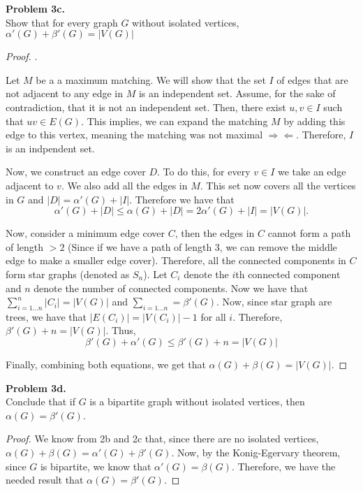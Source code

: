 \documentclass{article}
\newcommand{\size}[1]{|#1|}
\newcommand{\contradiction}{\Rightarrow\!\Leftarrow}
\newenvironment{hwproof}[2]
{
    \textbf{Problem #1.}\\
    #2
    \begin{proof}
}{
    \end{proof}
}
\begin{document}
\begin{hwproof}
    {3c}
    {Show that for every graph $G$ without isolated vertices, $\alpha'(G) + \beta'(G) = \size{V(G)}$}.

    Let $M$ be a a maximum matching. We will show that the set $I$ of edges that are not adjacent to any edge in $M$ is an independent set.
    Assume, for the sake of contradiction, that it is not an independent set.
    Then, there exist $u,v \in I$ such that $uv \in E(G)$. This implies, we can expand the matching $M$ by adding this edge to this
    vertex, meaning the matching was not maximal $\contradiction$. Therefore, $I$ is an indpendent set.

    Now, we construct an edge cover $D$. To do this, for every $v\in I$ we take an edge adjacent to $v$. We also add all the edges in $M$.
    This set now covers all the vertices in $G$ and $\size{D} = \alpha'(G) + \size{I}$. Therefore we have that
    \begin{equation*}
        \alpha'(G) + \size{D} \leq \alpha(G) + \size{D} = 2\alpha'(G) + \size{I} = \size{V(G)}.
    \end{equation*}

    Now, consider a minimum edge cover $C$, then the edges in $C$ cannot form a path of length $>2$ (Since if we have a path of length 3, we
    can remove the middle edge to make a smaller edge cover). Therefore, all the connected components in $C$ form star graphs (denoted as $S_n$).
    Let $C_i$ denote the $i$th connected component and $n$ denote the number of connected components.
    Now we have that $\sum_{i=1...n}^n \size{C_i} = \size{V(G)}$ and $\sum_{i=1...n} = \beta'(G)$. Now, since star graph are trees, we have that
    $\size{E(C_i)} = \size{V(C_i)} -1$ for all $i$. Therefore, $\beta'(G) + n = \size{V(G)}$. Thus,
    \begin{equation*}
        \beta'(G) + \alpha'(G) \leq \beta'(G) + n = \size{V(G)}
    \end{equation*}

    Finally, combining both equations, we get that $\alpha(G) + \beta(G) = \size{V(G)}$.
\end{hwproof}

\begin{hwproof}
    {3d}
    {Conclude that if $G$ is a bipartite graph without isolated vertices, then $\alpha(G) = \beta'(G)$.}

    We know from 2b and 2c that, since there are no isolated vertices, $\alpha(G) + \beta(G) = \alpha'(G) + \beta'(G)$. Now, by the Konig-Egervary
    theorem, since $G$ is bipartite, we know that $\alpha'(G) = \beta(G)$. Therefore, we have the needed result that $\alpha(G) = \beta'(G)$.
\end{hwproof}
\end{document}
